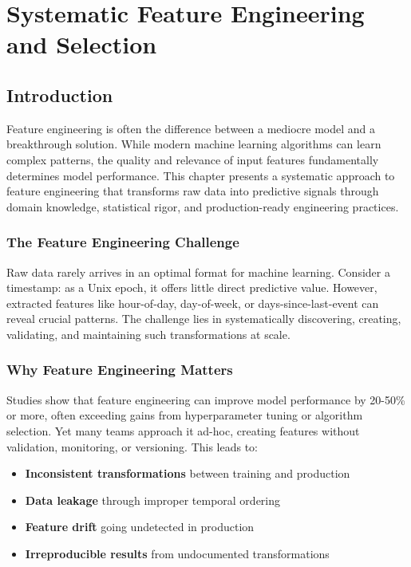 \chapter{Systematic Feature Engineering and Selection}

\section{Introduction}

Feature engineering is often the difference between a mediocre model and a breakthrough solution. While modern machine learning algorithms can learn complex patterns, the quality and relevance of input features fundamentally determines model performance. This chapter presents a systematic approach to feature engineering that transforms raw data into predictive signals through domain knowledge, statistical rigor, and production-ready engineering practices.

\subsection{The Feature Engineering Challenge}

Raw data rarely arrives in an optimal format for machine learning. Consider a timestamp: as a Unix epoch, it offers little direct predictive value. However, extracted features like hour-of-day, day-of-week, or days-since-last-event can reveal crucial patterns. The challenge lies in systematically discovering, creating, validating, and maintaining such transformations at scale.

\subsection{Why Feature Engineering Matters}

Studies show that feature engineering can improve model performance by 20-50\% or more, often exceeding gains from hyperparameter tuning or algorithm selection. Yet many teams approach it ad-hoc, creating features without validation, monitoring, or versioning. This leads to:

\begin{itemize}
    \item \textbf{Inconsistent transformations} between training and production
    \item \textbf{Data leakage} through improper temporal ordering
    \item \textbf{Feature drift} going undetected in production
    \item \textbf{Irreproducible results} from undocumented transformations
\end{itemize}


